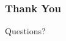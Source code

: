 \documentclass{beamer}
\begin{document}


\begin{frame}
  \frametitle{Thank You}
  \begin{center}
    \Huge Questions?
  \end{center}
\end{frame}
\end{document}
